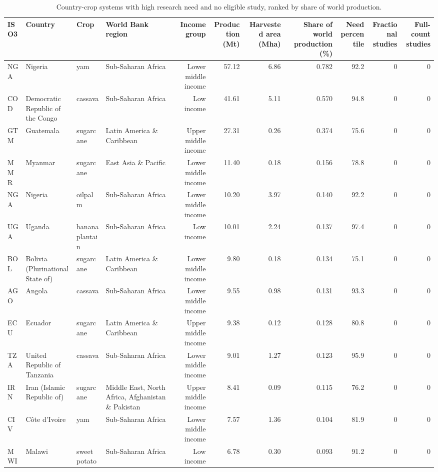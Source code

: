 \begin{table}[htbp]
\centering
\small
\caption{Country-crop systems with high research need and no eligible study, ranked by share of world production.}
\label{tab:tab_03_under_researched_systems}
\begin{tabular}{llllrrrrrrr}
\toprule
ISO3 & Country & Crop & World Bank region & Income group & Production (Mt) & Harvested area (Mha) & Share of world production (\%) & Need percentile & Fractional studies & Full-count studies \\
\midrule
NGA & Nigeria & yam & Sub-Saharan Africa  & Lower middle income & 57.12 & 6.86 & 0.782 & 92.2 & 0 & 0 \\
COD & Democratic Republic of the Congo & cassava & Sub-Saharan Africa  & Low income & 41.61 & 5.11 & 0.570 & 94.8 & 0 & 0 \\
GTM & Guatemala & sugarcane & Latin America \& Caribbean  & Upper middle income & 27.31 & 0.26 & 0.374 & 75.6 & 0 & 0 \\
MMR & Myanmar & sugarcane & East Asia \& Pacific & Lower middle income & 11.40 & 0.18 & 0.156 & 78.8 & 0 & 0 \\
NGA & Nigeria & oilpalm & Sub-Saharan Africa  & Lower middle income & 10.20 & 3.97 & 0.140 & 92.2 & 0 & 0 \\
UGA & Uganda & banana plantain & Sub-Saharan Africa  & Low income & 10.01 & 2.24 & 0.137 & 97.4 & 0 & 0 \\
BOL & Bolivia (Plurinational State of) & sugarcane & Latin America \& Caribbean  & Lower middle income & 9.80 & 0.18 & 0.134 & 75.1 & 0 & 0 \\
AGO & Angola & cassava & Sub-Saharan Africa  & Lower middle income & 9.55 & 0.98 & 0.131 & 93.3 & 0 & 0 \\
ECU & Ecuador & sugarcane & Latin America \& Caribbean  & Upper middle income & 9.38 & 0.12 & 0.128 & 80.8 & 0 & 0 \\
TZA & United Republic of Tanzania & cassava & Sub-Saharan Africa  & Lower middle income & 9.01 & 1.27 & 0.123 & 95.9 & 0 & 0 \\
IRN & Iran (Islamic Republic of) & sugarcane & Middle East, North Africa, Afghanistan \& Pakistan & Upper middle income & 8.41 & 0.09 & 0.115 & 76.2 & 0 & 0 \\
CIV & Côte d'Ivoire & yam & Sub-Saharan Africa  & Lower middle income & 7.57 & 1.36 & 0.104 & 81.9 & 0 & 0 \\
MWI & Malawi & sweet potato & Sub-Saharan Africa  & Low income & 6.78 & 0.30 & 0.093 & 91.2 & 0 & 0 \\

\end{tabular}
\end{table}
